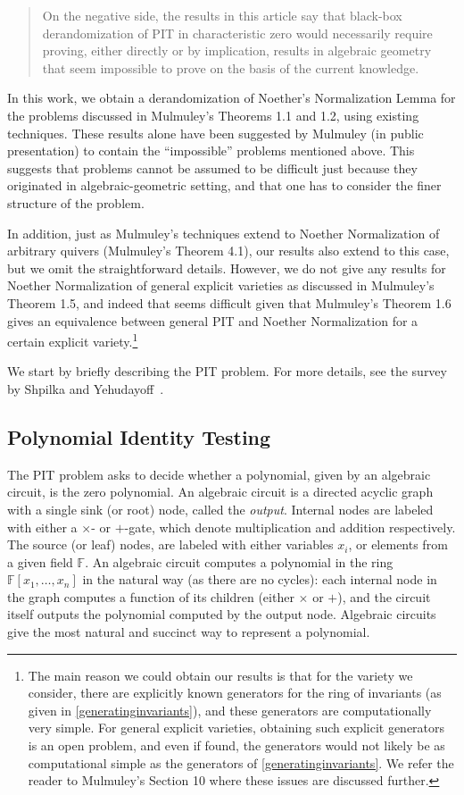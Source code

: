 \documentclass[letterpaper,11pt]{article}
\numberwithin{equation}{section}
\theoremstyle{plain}
\theoremstyle{remark}
\newcommand{\F}{\mathbb{F}}
\begin{document}
\begin{quote}
	On the negative side, the results in this article say that black-box derandomization of PIT in characteristic zero would necessarily require proving, either directly or by implication, results in algebraic geometry that seem impossible to prove on the basis of the current knowledge.
\end{quote}

In this work, we obtain a derandomization of Noether's Normalization Lemma for the problems discussed in Mulmuley's Theorems 1.1 and 1.2, using existing techniques.  These results alone have been suggested by Mulmuley (in public presentation) to contain the ``impossible'' problems mentioned above. This suggests that problems cannot be assumed to be difficult just because they originated in algebraic-geometric setting, and that one has to consider the finer structure of the problem.

In addition, just as Mulmuley's techniques extend to Noether Normalization of arbitrary quivers (Mulmuley's Theorem 4.1), our results also extend to this case, but we omit the straightforward details.  However, we do not give any results for Noether Normalization of general explicit varieties as discussed in Mulmuley's Theorem 1.5, and indeed that seems difficult given that Mulmuley's Theorem 1.6 gives an equivalence between general PIT and Noether Normalization for a certain explicit variety.\footnote{The main reason we could obtain our results is that for the variety we consider, there are explicitly known generators for the ring of invariants (as given in \autoref{generatinginvariants}), and these generators are computationally very simple. For general explicit varieties, obtaining such explicit generators is an open problem, and even if found, the generators would not likely be as computational simple as the generators of \autoref{generatinginvariants}. We refer the reader to Mulmuley's Section 10 where these issues are discussed further.}

We start by briefly describing the PIT problem.  For more details, see the survey by Shpilka and Yehudayoff~\cite{SY10}.

\subsection{Polynomial Identity Testing}

The PIT problem asks to decide whether a polynomial, given by an algebraic circuit, is the zero polynomial.  An algebraic circuit is a directed acyclic graph with a single sink (or root) node, called the \textit{output}.  Internal nodes are labeled with either a $\times$- or $+$-gate, which denote multiplication and addition respectively.  The source (or leaf) nodes, are labeled with either variables $x_i$, or elements from a given field $\F$.  An algebraic circuit computes a polynomial in the ring $\F[x_1,\ldots,x_n]$ in the natural way (as there are no cycles): each internal node in the graph computes a function of its children (either $\times$ or $+$), and the circuit itself outputs the polynomial computed by the output node. Algebraic circuits give the most natural and succinct way to represent a polynomial.
\end{document}
